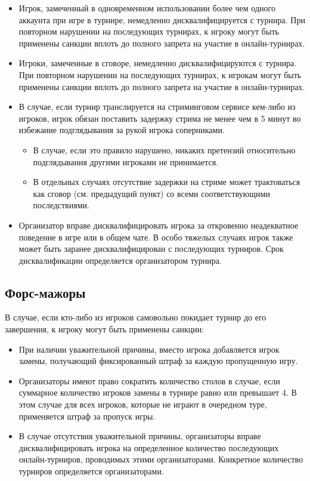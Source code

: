 \begin{itemize}
	\item Игрок, замеченный в одновременном использовании более чем одного аккаунта при игре в турнире, немедленно дисквалифицируется с турнира. При повторном нарушении на последующих турнирах, к игроку могут быть применены санкции вплоть до полного запрета на участие в онлайн-турнирах.
	\item Игроки, замеченные в сговоре, немедленно дисквалифицируются с турнира. При повторном нарушении на последующих турнирах, к игрокам могут быть применены санкции вплоть до полного запрета на участие в онлайн-турнирах.
	\item В случае, если турнир транслируется на стриминговом сервисе кем-либо из игроков, игрок обязан поставить задержку стрима не менее чем в 5 минут во избежание подглядывания за рукой игрока соперниками. 
	\begin{itemize}
		\item В случае, если это правило нарушено, никаких претензий относительно подглядывания другими игроками не принимается.
		\item В отдельных случаях отсутствие задержки на стриме может трактоваться как сговор (см. предыдущий пункт) со всеми соответствующими последствиями.
	\end{itemize}
	\item Организатор вправе дисквалифицировать игрока за откровенно неадекватное поведение в игре или в общем чате. В особо тяжелых случаях игрок также может быть заранее дисквалифицирован с последующих турниров. Срок дисквалификации определяется организатором турнира.
\end{itemize}

\subsection{Форс-мажоры}

В случае, если кто-либо из игроков самовольно покидает турнир до его завершения, к игроку могут быть применены санкции:

\begin{itemize}
	\item При наличии уважительной причины, вместо игрока добавляется игрок замены, получающий фиксированный штраф за каждую пропущенную игру.
	\item Организаторы имеют право сократить количество столов в случае, если суммарное количество игроков замены в турнире равно или превышает 4. В этом случае для всех игроков, которые не играют в очередном туре, применяется штраф за пропуск игры.
	\item В случае отсутствия уважительной причины, организаторы вправе дисквалифицировать игрока на определенное количество последующих онлайн-турниров, проводимых этими организаторами. Конкретное количество турниров определяется организаторами.
\end{itemize}

